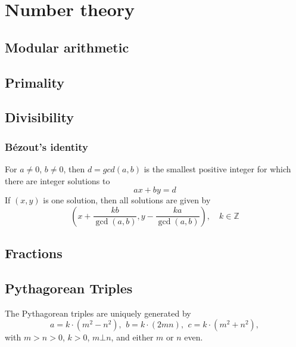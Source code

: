 \chapter{Number theory}

\section{Modular arithmetic}

\section{Primality}

\section{Divisibility}

	\subsection{Bézout's identity}
	For $a \neq 0$, $b \neq 0$, then $d=gcd(a,b)$ is the smallest positive integer for which there are integer solutions to
	$$ax+by=d$$
	If $(x,y)$ is one solution, then all solutions are given by
	$$\left(x+\frac{kb}{\gcd(a,b)}, y-\frac{ka}{\gcd(a,b)}\right), \quad k\in\mathbb{Z}$$


\section{Fractions}

\section{Pythagorean Triples}
 The Pythagorean triples are uniquely generated by
 \[ a=k\cdot (m^{2}-n^{2}),\ \,b=k\cdot (2mn),\ \,c=k\cdot (m^{2}+n^{2}), \]
 with $m > n > 0$, $k > 0$, $m \bot n$, and either $m$ or $n$ even.

